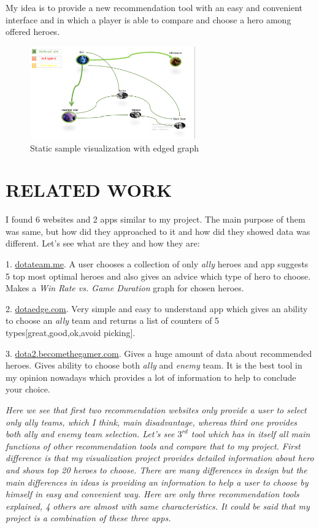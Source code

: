 \documentclass[twocolumn]{autart}    %
\begin{document}
My idea is to provide a new recommendation tool with an easy and convenient interface and in which a player is able to compare and choose a hero among offered heroes.

\begin{figure}
\begin{center}
\includegraphics[height=4cm]{firstidea.png}    %
\caption{Static sample visualization with edged graph}  %
\label{firstidea}                                 %
\end{center}                                 %
\end{figure}



\section{RELATED WORK}
I found 6 websites and 2 apps similar to my project. The main purpose of them was same, but how did they approached to it and how did they showed data was different. Let's see what are they and how they are:

1. \href{http://www.dotateam.me/}{dotateam.me}. A user chooses a collection of only \emph{ally} heroes and app suggests 5 top most optimal heroes and also gives an advice which type of hero to choose. Makes a \emph{Win Rate vs. Game Duration} graph for chosen heroes.

2. \href{http://www.dotaedge.com/}{dotaedge.com}. Very simple and easy to understand app which gives an ability to choose an \emph{ally} team and returns a list of counters of 5 types[great,good,ok,avoid picking].  

3. \href{https://dota2.becomethegamer.com/dashboard}{dota2.becomethegamer.com}. Gives a huge amount of data about recommended heroes. Gives ability to choose both \emph{ally} and \emph{enemy} team. It is the best tool in my opinion nowadays which provides a lot of information to help to conclude your choice. 

\emph{Here we see that first two recommendation  websites only provide a user to select only ally teams, which I think, main disadvantage, whereas third one provides both ally and enemy team selection. Let's see $3^{rd}$ tool which has in itself all main functions of other recommendation tools and compare  that to my project. First difference is that my visualization project provides detailed information about hero and shows top 20 heroes to choose. There are many differences in design but the main differences in ideas is providing an information to help a user to choose by himself in easy and convenient way. 
Here are only three recommendation tools explained, 4 others are almost with same characteristics. It could be said that my project is a combination of these three apps. }
\end{document}
